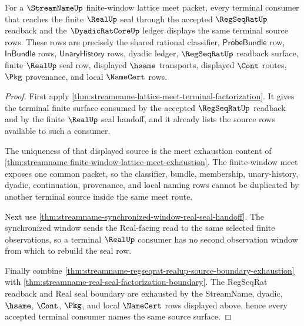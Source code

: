 \begin{theorem}
\label{thm:streamname-lattice-meet-terminal-source-uniqueness}
For a $\StreamNameUp$ finite-window lattice meet packet, every terminal consumer that reaches the finite $\RealUp$ seal through the accepted $\RegSeqRatUp$ readback and the $\DyadicRatCoreUp$ ledger displays the same terminal source rows. These rows are precisely the shared rational classifier, $\mathsf{ProbeBundle}$ row, $\mathsf{InBundle}$ rows, $\mathsf{UnaryHistory}$ rows, dyadic ledger, $\RegSeqRatUp$ readback surface, finite $\RealUp$ seal row, displayed $\hsame$ transports, displayed $\Cont$ routes, $\Pkg$ provenance, and local $\NameCert$ rows.
\end{theorem}
\begin{proof}
First apply \autoref{thm:streamname-lattice-meet-terminal-factorization}. It gives the terminal finite surface consumed by the accepted $\RegSeqRatUp$ readback and by the finite $\RealUp$ seal handoff, and it already lists the source rows available to such a consumer.

The uniqueness of that displayed source is the meet exhaustion content of \autoref{thm:streamname-finite-window-lattice-meet-exhaustion}. The finite-window meet exposes one common packet, so the classifier, bundle, membership, unary-history, dyadic, continuation, provenance, and local naming rows cannot be duplicated by another terminal source inside the same meet route.

Next use \autoref{thm:streamname-synchronized-window-real-seal-handoff}. The synchronized window sends the Real-facing read to the same selected finite observations, so a terminal $\RealUp$ consumer has no second observation window from which to rebuild the seal row.

Finally combine \autoref{thm:streamname-regseqrat-realup-source-boundary-exhaustion} with \autoref{thm:streamname-real-seal-factorization-boundary}. The RegSeqRat readback and Real seal boundary are exhausted by the StreamName, dyadic, $\hsame$, $\Cont$, $\Pkg$, and local $\NameCert$ rows displayed above, hence every accepted terminal consumer names the same source surface.
\end{proof}

